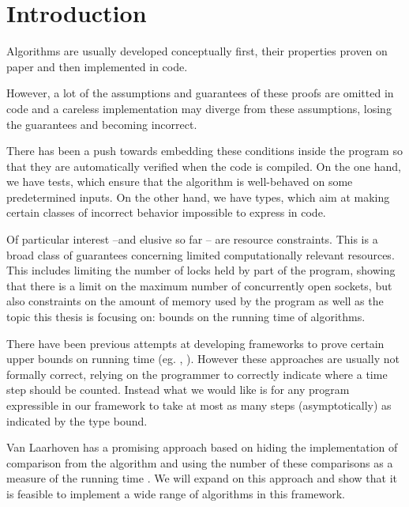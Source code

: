 
\chapter{Introduction}
Algorithms are usually developed conceptually first, their properties proven on paper and then implemented in code.

However, a lot of the assumptions and guarantees of these proofs are omitted in code and a careless implementation may diverge from these assumptions, losing the guarantees and becoming incorrect.

There has been a push towards embedding these conditions inside the program so that they are automatically verified when the code is compiled. On the one hand, we have tests, which ensure that the algorithm is well-behaved on some predetermined inputs. On the other hand, we have types, which aim at making certain classes of incorrect behavior impossible to express in code.

Of particular interest --and elusive so far -- are resource constraints. This is a broad class of guarantees concerning limited computationally relevant resources. This includes limiting the number of locks held by part of the program, showing that there is a limit on the maximum number of concurrently open sockets, but also constraints on the amount of memory used by the program as well as the topic this thesis is focusing on: bounds on the running time of algorithms.

There have been previous attempts at developing frameworks to prove certain upper bounds on running time (eg. \cite{danielsson:2008:time-complexity-analysis}, \cite{nipkow:2017:verified-root-balanced-trees}). However these approaches are usually not formally correct, relying on the programmer to correctly indicate where a time step should be counted. Instead what we would like is for any program expressible in our framework to take at most as many steps (asymptotically) as indicated by the type bound.

Van Laarhoven has a promising approach based on hiding the implementation of comparison from the algorithm and using the number of these comparisons as a measure of the running time \cite{laarhoven:2013:correctness-sorting}. We will expand on this approach and show that it is feasible to implement a wide range of algorithms in this framework.